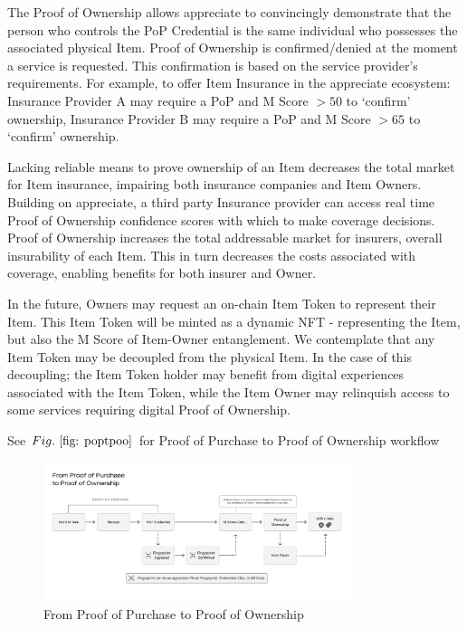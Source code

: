\documentclass[a4paper,onecolumn, 10.5pt]{article}
\begin{document}
The Proof of Ownership allows appreciate to convincingly demonstrate that the person who controls the PoP Credential is the same individual who possesses the associated physical Item.  Proof of Ownership is confirmed/denied at the moment a service is requested.  This confirmation is based on the service provider’s requirements.  For example, to offer Item Insurance in the appreciate ecosystem: Insurance Provider A may require a PoP and M Score $>50$ to ‘confirm’ ownership, Insurance Provider B may require a PoP and M Score $>65$ to ‘confirm’ ownership.  

\begin{tcolorbox}[colback=gray!5!white,colframe=gray!50!black, title=A case for Proof of Ownership: Item Insurance 
	]
	
	Lacking reliable means to prove ownership of an Item decreases the total market for Item insurance, impairing both insurance companies and Item Owners. Building on appreciate, a third party Insurance provider can access real time Proof of Ownership confidence scores with which to make coverage decisions. Proof of Ownership increases the total addressable market for insurers, overall insurability of each Item. This in turn decreases the costs associated with coverage, enabling benefits for both insurer and Owner.
	
\end{tcolorbox}

In the future, Owners may request an on-chain Item Token to represent their Item.  This Item Token will be minted as a dynamic NFT - representing the Item, but also the M Score of Item-Owner entanglement.  We contemplate that any Item Token may be decoupled from the physical Item.  In the case of this decoupling; the Item Token holder may benefit from digital experiences associated with the Item Token, while the Item Owner may relinquish access to some services requiring digital Proof of Ownership.

See \(Fig.~\ref{fig: poptpoo}\) for Proof of Purchase to Proof of Ownership workflow

\begin{figure}[!htb]
	\centering %
		\includegraphics[clip, trim=0cm 2cm 0cm 6cm, width=0.80\textwidth]{./images/From_Proof_of_Purchase_to_Proof_of_Ownership.pdf}
	\caption{From Proof of Purchase to Proof of Ownership }
	\label{fig: poptpoo}
\end{figure}
\end{document}

